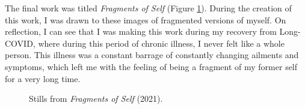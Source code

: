 The final work was titled \textit{Fragments of Self} \citeyearpar{broad2021fragments} (Figure \ref{fig:c7:fragments}). 
During the creation of this work, I was  drawn to these images of fragmented versions of myself. 
On reflection, I can see that I was making this work during my recovery from Long-COVID, where during this period of chronic illness, I never felt like a whole person. 
This illness was a constant barrage of constantly changing ailments and symptoms, which left me with the feeling of being a fragment of my former self for a very long time.

\begin{figure}[!htbp]
    \centering
    \hfill
    \hfill
    \caption[Stills from \textit{Fragments of Self}]{Stills from \textit{Fragments of Self} (2021).}
    \label{fig:c7:fragments}
 \end{figure}

